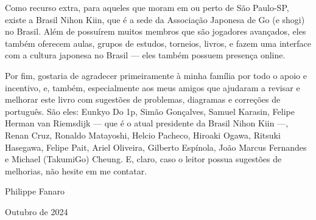 Como recurso extra, para aqueles que moram em ou perto de São Paulo-SP, existe a Brasil Nihon Kiin, que é a sede da Associação Japonesa de Go (e shogi) no Brasil. Além de possuírem muitos membros que são jogadores avançados, eles também oferecem aulas, grupos de estudos, torneios, livros, e fazem uma interface com a cultura japonesa no Brasil --- eles também possuem presença online.

Por fim, gostaria de agradecer primeiramente à minha família por todo o apoio e incentivo, e, também, especialmente aos meus amigos que ajudaram a revisar e melhorar este livro com sugestões de problemas, diagramas e correções de português. São eles: Eunkyo Do 1p, Simão Gonçalves, Samuel Karasin, Felipe Herman van Riemsdijk --- que é o atual presidente da Brasil Nihon Kiin ---, Renan Cruz, Ronaldo Matayoshi, Helcio Pacheco, Hiroaki Ogawa, Ritsuki Hasegawa, Felipe Pait, Ariel Oliveira, Gilberto Espínola, João Marcus Fernandes e Michael (TakumiGo) Cheung. E, claro, caso o leitor possua sugestões de melhorias, não hesite em me contatar.

\bigskip

\hspace*{\fill} Philippe Fanaro \hspace{0.055cm}

\hspace*{\fill} Outubro de 2024 \hspace{0.05cm}

\clearedpage
\clearedpage